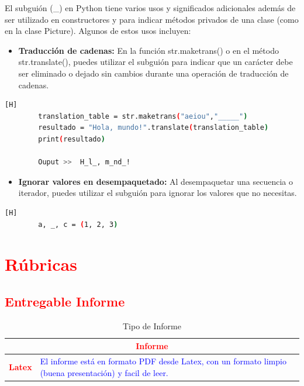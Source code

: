 \documentclass{article}
\begin{document}
	\vspace{0.3cm}
El subguión (\_) en Python tiene varios usos y significados adicionales además de ser utilizado en constructores y para indicar métodos privados de una clase (como en la clase Picture). Algunos de estos usos incluyen:
	
	\begin{itemize}
		\item \textbf{Traducción de cadenas:} En la función str.maketrans() o en el método str.translate(), puedes utilizar el subguión para indicar que un carácter debe ser eliminado o dejado sin cambios durante una operación de traducción de cadenas.
	\end{itemize}
	
	\begin{lstlisting}[language=bash,caption={Ejemplo}][H]
		translation_table = str.maketrans("aeiou","_____")
		resultado = "Hola, mundo!".translate(translation_table)
		print(resultado)			
			
		Ouput >>  H_l_, m_nd_!
	\end{lstlisting}		
	
	\begin{itemize}
		\item \textbf{Ignorar valores en desempaquetado:} Al desempaquetar una secuencia o iterador, puedes utilizar el subguión para ignorar los valores que no necesitas. 
	\end{itemize}
	
	\begin{lstlisting}[language=bash,caption={Ejemplo}][H]
		a, _, c = (1, 2, 3)
	\end{lstlisting}	
	
\vspace{0.3cm}


	\section{\textcolor{red}{Rúbricas}}
	
	\subsection{\textcolor{red}{Entregable Informe}}
	\begin{table}[H]
		\caption{Tipo de Informe}
		\setlength{\tabcolsep}{0.5em} %
		{\renewcommand{\arraystretch}{1.5}%
		\begin{tabular}{|p{3cm}|p{12cm}|}
			\hline
			\multicolumn{2}{|c|}{\textbf{\textcolor{red}{Informe}}}  \\
			\hline 
			\textbf{\textcolor{red}{Latex}} & \textcolor{blue}{El informe está en formato PDF desde Latex,  con un formato limpio (buena presentación) y facil de leer.}   \\ 
			\hline 
			
			
		\end{tabular}
	}
	\end{table}
	
\end{document}
